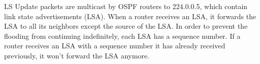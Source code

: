 LS Update packets are multicast by OSPF routers to 224.0.0.5, which contain link state advertisements (LSA). When a router receives an LSA, it forwards the LSA to all its neighbors except the source of the LSA. In order to prevent the flooding from continuing indefinitely, each LSA has a sequence number. If a router receives an LSA with a sequence number it has already received previously, it won't forward the LSA anymore.
